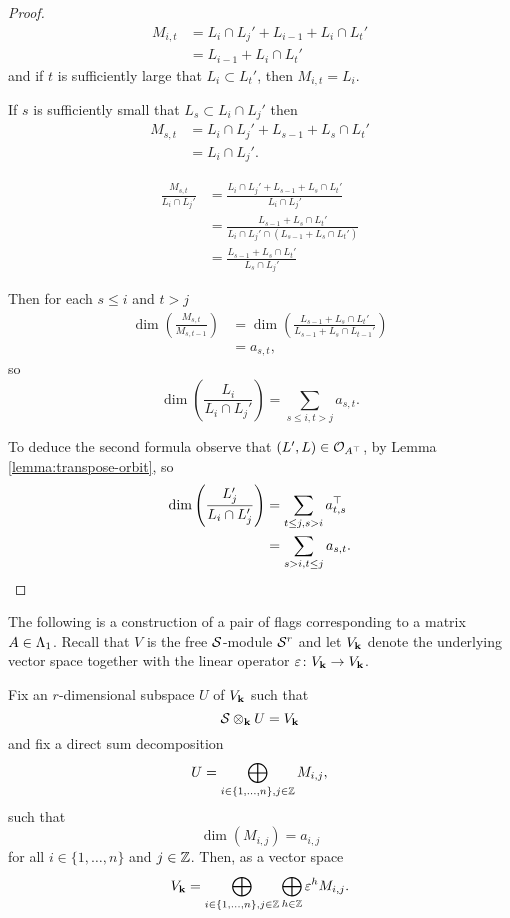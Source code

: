 \documentclass[a4paper, 11pt, twoside]{report}
\begin{document}
\begin{proof}
\begin{align*}
M_{i,t}
&= L_i\cap L_j' + L_{i-1} + L_i\cap L_t'\\
&= L_{i-1} + L_i\cap L_t'
\end{align*}
and if $t$ is sufficiently large that $L_i\subset L_t'$, then $M_{i,t}=L_i$.

If $s$ is sufficiently small that $L_s\subset L_i\cap L_j'$ then
\begin{align*}
M_{s,t}
&= L_i\cap L_j' + L_{s-1} + L_s\cap L_t'\\
&= L_i\cap L_j'.
\end{align*}

\begin{align*}
\frac{M_{s,t}}{L_i\cap L_j'}
&= \frac{L_i\cap L_j' + L_{s-1} + L_s\cap L_t'}{L_i\cap L_j'}\\
&= \frac{L_{s-1} + L_s\cap L_t'}{L_i\cap L_j'\cap(L_{s-1} + L_s\cap L_t')}\\
&= \frac{L_{s-1} + L_s\cap L_t'}{L_s\cap L_j'}
\end{align*}

Then for each $s\le i$ and $t>j$
\begin{align*}
\dim\left(\frac{M_{s,t}}{M_{s,t-1}}\right)
&= \dim\left(\frac{L_{s-1} + L_s\cap L_t'}{L_{s-1} + L_s\cap L_{t-1}'}\right)\\
&= a_{s,t},
\end{align*}
so
\begin{equation*}
\dim\left(\frac{L_i}{L_i\cap L_j'}\right) = \sum_{s\le i, t>j} a_{s,t}.
\end{equation*}

To deduce the second formula observe that $(L',L)\in\mathcal{O}_{A^\top}$, by Lemma \ref{lemma:transpose-orbit}, so
\begin{align*}
\dim\left(\frac{L_j'}{L_i\cap L_j'}\right)
&= \sum_{t\le j, s>i} a_{t,s}^\top\\
&= \sum_{s>i, t\le j} a_{s,t}.
\end{align*}
\end{proof}

The following is a construction of a pair of flags corresponding to a matrix $A\in\Lambda_1{}$. Recall that $V$ is the free $\mathcal{S}$-module $\mathcal{S}^r$ and let $V_{\mathbf{k}}$ denote the underlying vector space together with the linear operator $\varepsilon\colon V_{\mathbf{k}}\to V_{\mathbf{k}}$.

Fix an $r$-dimensional subspace $U$ of $V_{\mathbf{k}}$ such that
\begin{equation*}
\mathcal{S}\otimes_{\mathbf{k}}U = V_{\mathbf{k}}
\end{equation*}
and fix a direct sum decomposition
\begin{equation*}
U = \bigoplus_{i\in\{1,\ldots,n\},j\in\mathbb{Z}} M_{i,j},
\end{equation*}
such that
\begin{equation*}
\dim\left(M_{i,j}\right) = a_{i,j}
\end{equation*}
for all $i\in\{1,\ldots,n\}$ and $j\in\mathbb{Z}$. Then, as a vector space
\begin{equation*}
V_{\mathbf{k}} = \bigoplus_{i\in\{1,\ldots,n\},j\in\mathbb{Z}}\bigoplus_{h\in\mathbb{Z}} \varepsilon^hM_{i,j}.
\end{equation*}
\end{document}
